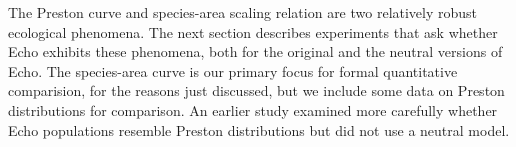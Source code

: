 The Preston curve and species-area scaling relation are two relatively
robust ecological phenomena.  The next section describes experiments
that ask whether Echo exhibits these phenomena, both for the original
and the neutral versions of Echo.  The species-area curve is our
primary focus for formal quantitative comparision, for the reasons
just discussed, but we include some data on Preston distributions for
comparison.  An earlier study \cite{ForrestAndJones94} examined more
carefully whether Echo populations resemble Preston distributions but
did not use a neutral model.


